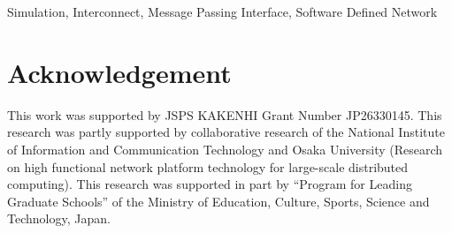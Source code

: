 \documentclass[conference]{IEEEtran}
\begin{document}
\begin{IEEEkeywords}
    Simulation, Interconnect, Message Passing Interface, Software Defined Network
\end{IEEEkeywords}








\section*{Acknowledgement}
This work was supported by JSPS KAKENHI Grant Number JP26330145. This research
was partly supported by collaborative research of the National Institute of
Information and Communication Technology and Osaka University (Research on
high functional network platform technology for large-scale distributed
computing). This research was supported in part by ``Program for Leading
Graduate Schools'' of the Ministry of Education, Culture, Sports, Science and
Technology, Japan.

\printbibliography[heading=bibintoc,title={References}]

\par\leavevmode
\end{document}
